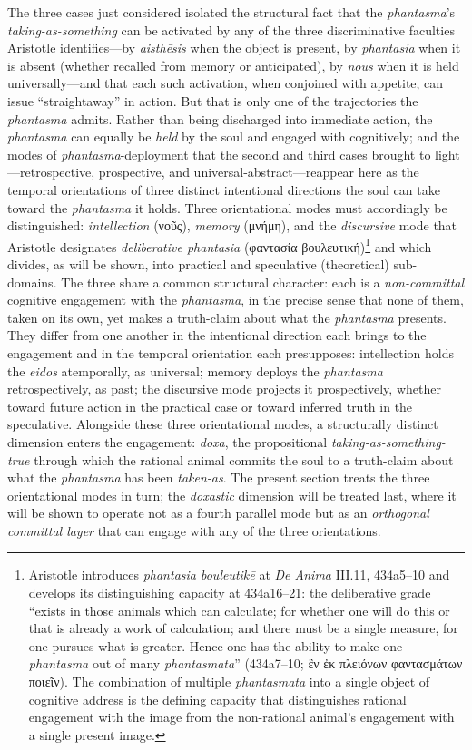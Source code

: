 \documentclass{article}
\newcommand{\gk}[1]{{\greekfont #1}}
\begin{document}
The three cases just considered isolated the structural fact that the \textit{phantasma}'s \textit{taking-as-something} can be activated by any of the three discriminative faculties Aristotle identifies---by \textit{aisthēsis} when the object is present, by \textit{phantasia} when it is absent (whether recalled from memory or anticipated), by \textit{nous} when it is held universally---and that each such activation, when conjoined with appetite, can issue ``straightaway'' in action. But that is only one of the trajectories the \textit{phantasma} admits. Rather than being discharged into immediate action, the \textit{phantasma} can equally be \textit{held} by the soul and engaged with cognitively; and the modes of \textit{phantasma}-deployment that the second and third cases brought to light---retrospective, prospective, and universal-abstract---reappear here as the temporal orientations of three distinct intentional directions the soul can take toward the \textit{phantasma} it holds. Three orientational modes must accordingly be distinguished: \textit{intellection} (\gk{νοῦς}), \textit{memory} (\gk{μνήμη}), and the \textit{discursive} mode that Aristotle designates \textit{deliberative phantasia} (\gk{φαντασία βουλευτική})\footnote{Aristotle introduces \textit{phantasia bouleutik\=e} at \textit{De Anima} III.11, 434a5--10 and develops its distinguishing capacity at 434a16--21: the deliberative grade ``exists in those animals which can calculate; for whether one will do this or that is already a work of calculation; and there must be a single measure, for one pursues what is greater. Hence one has the ability to make one \textit{phantasma} out of many \textit{phantasmata}'' (434a7--10; \gk{ἓν ἐκ πλειόνων φαντασμάτων ποιεῖν}). The combination of multiple \textit{phantasmata} into a single object of cognitive address is the defining capacity that distinguishes rational engagement with the image from the non-rational animal's engagement with a single present image.} and which divides, as will be shown, into practical and speculative (theoretical) sub-domains. The three share a common structural character: each is a \textit{non-committal} cognitive engagement with the \textit{phantasma}, in the precise sense that none of them, taken on its own, yet makes a truth-claim about what the \textit{phantasma} presents. They differ from one another in the intentional direction each brings to the engagement and in the temporal orientation each presupposes: intellection holds the \textit{eidos} atemporally, as universal; memory deploys the \textit{phantasma} retrospectively, as past; the discursive mode projects it prospectively, whether toward future action in the practical case or toward inferred truth in the speculative. Alongside these three orientational modes, a structurally distinct dimension enters the engagement: \textit{doxa}, the propositional \textit{taking-as-something-true} through which the rational animal commits the soul to a truth-claim about what the \textit{phantasma} has been \textit{taken-as}. The present section treats the three orientational modes in turn; the \textit{doxastic} dimension will be treated last, where it will be shown to operate not as a fourth parallel mode but as an \textit{orthogonal committal layer} that can engage with any of the three orientations.
\end{document}
